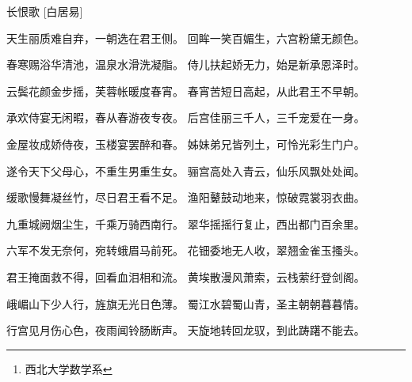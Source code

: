 \documentclass[12pt,a4paper]{article}
\begin{document}
\pagestyle{yang}
\title{}
\author{杨树伟\thanks{西北大学数学系}}
{长恨歌   [白居易]}


天生丽质难自弃，一朝选在君王侧。
回眸一笑百媚生，六宫粉黛无颜色。

春寒赐浴华清池，温泉水滑洗凝脂。
侍儿扶起娇无力，始是新承恩泽时。

云鬓花颜金步摇，芙蓉帐暖度春宵。
春宵苦短日高起，从此君王不早朝。

承欢侍宴无闲暇，春从春游夜专夜。
后宫佳丽三千人，三千宠爱在一身。

金屋妆成娇侍夜，玉楼宴罢醉和春。
姊妹弟兄皆列土，可怜光彩生门户。

遂令天下父母心，不重生男重生女。
骊宫高处入青云，仙乐风飘处处闻。

缓歌慢舞凝丝竹，尽日君王看不足。
渔阳鼙鼓动地来，惊破霓裳羽衣曲。

九重城阙烟尘生，千乘万骑西南行。
翠华摇摇行复止，西出都门百余里。

六军不发无奈何，宛转蛾眉马前死。
花钿委地无人收，翠翘金雀玉搔头。

君王掩面救不得，回看血泪相和流。
黄埃散漫风萧索，云栈萦纡登剑阁。

峨嵋山下少人行，旌旗无光日色薄。
蜀江水碧蜀山青，圣主朝朝暮暮情。

行宫见月伤心色，夜雨闻铃肠断声。
天旋地转回龙驭，到此踌躇不能去。
\end{document}
